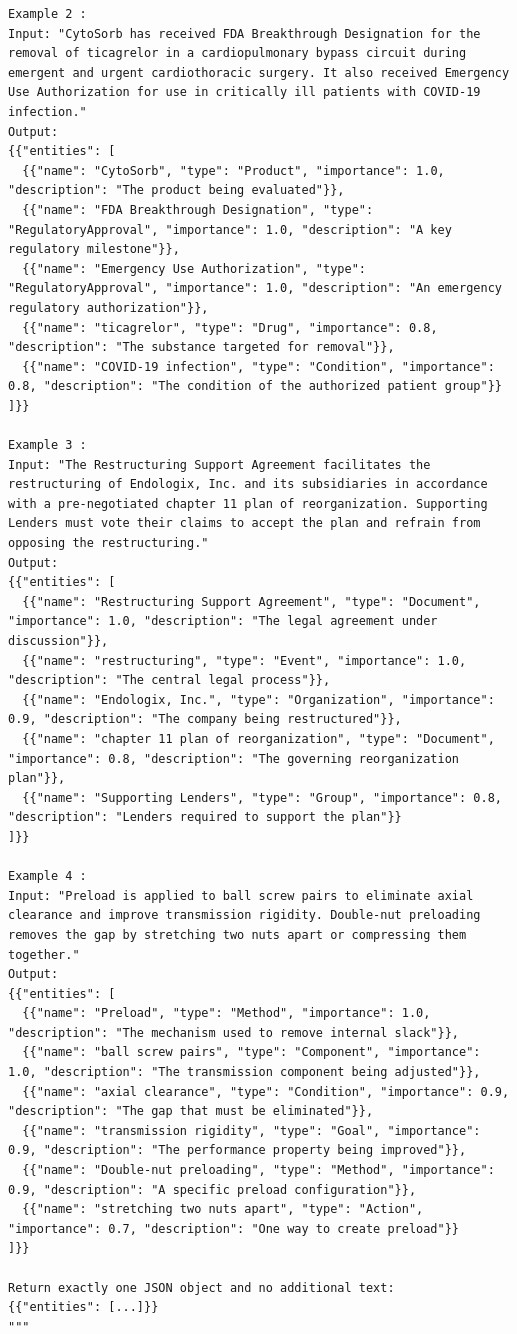 \documentclass{article} %
\begin{document}
\begin{lstlisting}
Example 2 :
Input: "CytoSorb has received FDA Breakthrough Designation for the removal of ticagrelor in a cardiopulmonary bypass circuit during emergent and urgent cardiothoracic surgery. It also received Emergency Use Authorization for use in critically ill patients with COVID-19 infection."
Output:
{{"entities": [
  {{"name": "CytoSorb", "type": "Product", "importance": 1.0, "description": "The product being evaluated"}},
  {{"name": "FDA Breakthrough Designation", "type": "RegulatoryApproval", "importance": 1.0, "description": "A key regulatory milestone"}},
  {{"name": "Emergency Use Authorization", "type": "RegulatoryApproval", "importance": 1.0, "description": "An emergency regulatory authorization"}},
  {{"name": "ticagrelor", "type": "Drug", "importance": 0.8, "description": "The substance targeted for removal"}},
  {{"name": "COVID-19 infection", "type": "Condition", "importance": 0.8, "description": "The condition of the authorized patient group"}}
]}}

Example 3 :
Input: "The Restructuring Support Agreement facilitates the restructuring of Endologix, Inc. and its subsidiaries in accordance with a pre-negotiated chapter 11 plan of reorganization. Supporting Lenders must vote their claims to accept the plan and refrain from opposing the restructuring."
Output:
{{"entities": [
  {{"name": "Restructuring Support Agreement", "type": "Document", "importance": 1.0, "description": "The legal agreement under discussion"}},
  {{"name": "restructuring", "type": "Event", "importance": 1.0, "description": "The central legal process"}},
  {{"name": "Endologix, Inc.", "type": "Organization", "importance": 0.9, "description": "The company being restructured"}},
  {{"name": "chapter 11 plan of reorganization", "type": "Document", "importance": 0.8, "description": "The governing reorganization plan"}},
  {{"name": "Supporting Lenders", "type": "Group", "importance": 0.8, "description": "Lenders required to support the plan"}}
]}}

Example 4 :
Input: "Preload is applied to ball screw pairs to eliminate axial clearance and improve transmission rigidity. Double-nut preloading removes the gap by stretching two nuts apart or compressing them together."
Output:
{{"entities": [
  {{"name": "Preload", "type": "Method", "importance": 1.0, "description": "The mechanism used to remove internal slack"}},
  {{"name": "ball screw pairs", "type": "Component", "importance": 1.0, "description": "The transmission component being adjusted"}},
  {{"name": "axial clearance", "type": "Condition", "importance": 0.9, "description": "The gap that must be eliminated"}},
  {{"name": "transmission rigidity", "type": "Goal", "importance": 0.9, "description": "The performance property being improved"}},
  {{"name": "Double-nut preloading", "type": "Method", "importance": 0.9, "description": "A specific preload configuration"}},
  {{"name": "stretching two nuts apart", "type": "Action", "importance": 0.7, "description": "One way to create preload"}}
]}}

Return exactly one JSON object and no additional text:
{{"entities": [...]}}
"""
\end{lstlisting}
\end{document}
